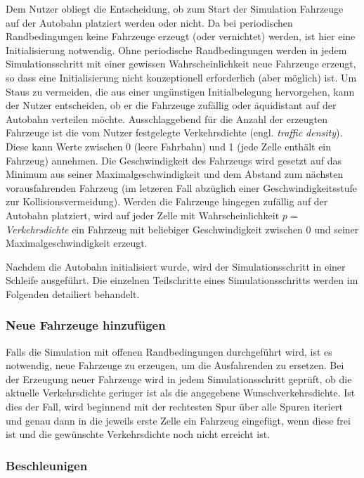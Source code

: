 \documentclass[10pt, a4paper]{article}
\begin{document}
Dem Nutzer obliegt die Entscheidung, ob zum Start der Simulation Fahrzeuge auf der Autobahn platziert werden oder nicht. Da bei periodischen Randbedingungen keine Fahrzeuge erzeugt (oder vernichtet) werden, ist hier eine Initialisierung notwendig. Ohne periodische Randbedingungen werden in jedem Simulationsschritt mit einer gewissen Wahrscheinlichkeit neue Fahrzeuge erzeugt, so dass eine Initialisierung nicht konzeptionell erforderlich (aber möglich) ist. Um Staus zu vermeiden, die aus einer ungünstigen Initialbelegung hervorgehen, kann der Nutzer entscheiden, ob er die Fahrzeuge zufällig oder äquidistant auf der Autobahn verteilen möchte.
Ausschlaggebend für die Anzahl der erzeugten Fahrzeuge ist die vom Nutzer festgelegte Verkehrsdichte (engl. \emph{traffic density}). Diese kann Werte zwischen 0 (leere Fahrbahn) und 1 (jede Zelle enthält ein Fahrzeug) annehmen. Die Geschwindigkeit des Fahrzeugs wird gesetzt auf das Minimum aus seiner Maximalgeschwindigkeit und dem Abstand zum nächsten vorausfahrenden Fahrzeug (im letzeren Fall abzüglich einer Geschwindigkeitsstufe zur Kollisionsvermeidung). Werden die Fahrzeuge hingegen zufällig auf der Autobahn platziert, wird auf jeder Zelle mit Wahrscheinlichkeit $p =$ \emph{Verkehrsdichte} ein Fahrzeug mit beliebiger Geschwindigkeit zwischen 0 und seiner Maximalgeschwindigkeit erzeugt.

Nachdem die Autobahn initialisiert wurde, wird der Simulationsschritt in einer Schleife ausgeführt. Die einzelnen Teilschritte eines Simulationsschritts werden im Folgenden detailiert behandelt.


\subsubsection{Neue Fahrzeuge hinzufügen}
\label{subsubsec:neueFahrzeuge}

Falls die Simulation mit offenen Randbedingungen durchgeführt wird, ist es notwendig, neue Fahrzeuge zu erzeugen, um die Ausfahrenden zu ersetzen. Bei der Erzeugung neuer Fahrzeuge wird in jedem Simulationsschritt geprüft, ob die aktuelle Verkehrsdichte geringer ist als die angegebene Wunschverkehrsdichte. Ist dies der Fall, wird beginnend mit der rechtesten Spur über alle Spuren iteriert und genau dann in die jeweils erste Zelle ein Fahrzeug eingefügt, wenn diese frei ist und die gewünschte Verkehrsdichte noch nicht erreicht ist.

\subsubsection{Beschleunigen}
\label{subsubsec:beschleunigen}
\end{document}
